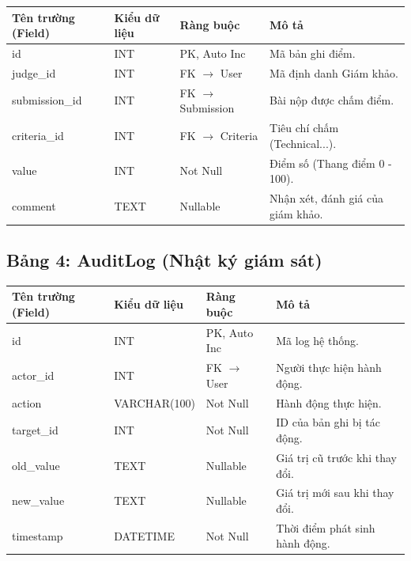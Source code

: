 \begin{tabular}{llll}
\toprule
\textbf{Tên trường (Field)} & \textbf{Kiểu dữ liệu} & \textbf{Ràng buộc} & \textbf{Mô tả} \\ \midrule
id & INT & PK, Auto Inc & Mã bản ghi điểm. \\
judge\_id & INT & FK $\rightarrow$ User & Mã định danh Giám khảo. \\
submission\_id & INT & FK $\rightarrow$ Submission & Bài nộp được chấm điểm. \\
criteria\_id & INT & FK $\rightarrow$ Criteria & Tiêu chí chấm (Technical...). \\
value & INT & Not Null & Điểm số (Thang điểm 0 - 100). \\
comment & TEXT & Nullable & Nhận xét, đánh giá của giám khảo. \\ \bottomrule
\end{tabular}

\subsection{Bảng 4: AuditLog (Nhật ký giám sát)}

\begin{tabular}{llll}
\toprule
\textbf{Tên trường (Field)} & \textbf{Kiểu dữ liệu} & \textbf{Ràng buộc} & \textbf{Mô tả} \\ \midrule
id & INT & PK, Auto Inc & Mã log hệ thống. \\
actor\_id & INT & FK $\rightarrow$ User & Người thực hiện hành động. \\
action & VARCHAR(100) & Not Null & Hành động thực hiện. \\
target\_id & INT & Not Null & ID của bản ghi bị tác động. \\
old\_value & TEXT & Nullable & Giá trị cũ trước khi thay đổi. \\
new\_value & TEXT & Nullable & Giá trị mới sau khi thay đổi. \\
timestamp & DATETIME & Not Null & Thời điểm phát sinh hành động. \\ \bottomrule
\end{tabular}
